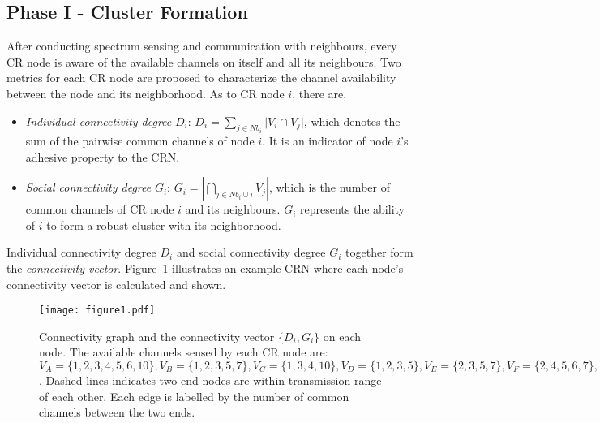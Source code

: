 \documentclass[journal,comsoc]{IEEEtran}
\theoremstyle{mytheoremstyle}
\theoremstyle{mytheoremstyle}
\theoremstyle{mytheoremstyle}
\begin{document}
\subsection{Phase I - Cluster Formation}
\label{phaseI}
After conducting spectrum sensing and communication with neighbours, every CR node is aware of the available channels on itself and all its neighbours.
Two metrics for each CR node are proposed to characterize the channel availability between the node and its neighborhood.
As to CR node $i$, there are,
\begin{itemize}

\item \textit{Individual connectivity degree} $D_i$: $D_i=\sum_{j\in Nb_i}\vert V_i\cap V_j\vert$, which denotes the sum of the pairwise common channels of node $i$. 
It is an indicator of node $i$'s adhesive property to the CRN. 

\item \textit{Social connectivity degree} $G_i$: $G_i=|\bigcap_{j\in Nb_i\cup i}V_j|$, which is the number of common channels of CR node $i$ and its neighbours.
$G_i$ represents the ability of $i$ to form a robust cluster with its neighborhood.
\end{itemize}
Individual connectivity degree $D_i$ and social connectivity degree $G_i$ together form the \textit{connectivity vector}.
Figure~\ref{fig1} illustrates an example CRN where each node's connectivity vector is calculated and shown.	
\begin{figure}[ht!]
  \centering
\texttt{[image: figure1.pdf]}
	\caption{Connectivity graph and the connectivity vector $\{D_i, G_i\}$ on each node. The available channels sensed by each CR node are: $V_A=\{1,2,3,4,5,6,10\}, V_B=\{1,2,3,5,7\}, V_C=\{1,3,4,10\}, V_D=\{1,2,3,5\}, V_E=\{2,3,5,7\}, V_F=\{2,4,5,6,7\}, V_G=\{1,2,3,4,8\}, V_H=\{1,2,5,8\}$. Dashed lines indicates two end nodes are within transmission range of each other. Each edge is labelled by the number of common channels between the two ends.}
	\label{fig1}
\end{figure}
\end{document}
